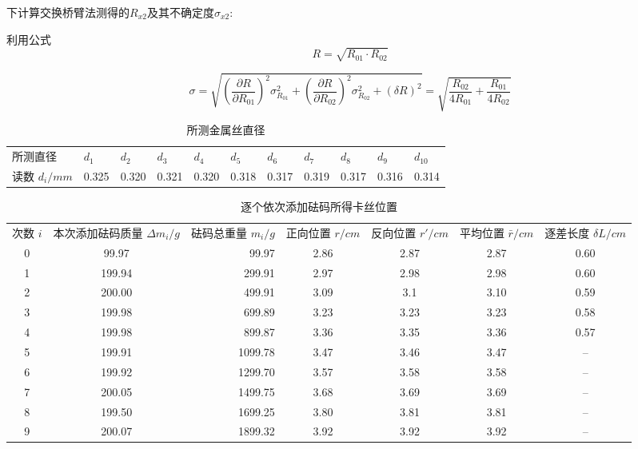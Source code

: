 \documentclass{ctexart}
\begin{document}
 
 下计算交换桥臂法测得的$R_{x2}$及其不确定度$\sigma_{x2}$:
 
 利用公式$$R=\sqrt{R_{01}\cdot R_{02}}$$

$$\sigma=\sqrt{(\frac{\partial R}{\partial R_{01}})^2\sigma_{R_{01}}^2+(\frac{\partial R}{\partial R_{02}})^2\sigma_{R_{02}}^2+(\delta R)^2}=\sqrt{\frac{R_{02}}{4R_{01}}+\frac{R_{01}}{4R_{02}}}$$

\begin{table}[H]
  \centering
  \caption{所测金属丝直径}
   
      \resizebox{\textwidth}{!}
      {
        \begin{tabular}{lrrrrrrrrrr}
    所测直径 & \multicolumn{1}{l}{$d_1$} & \multicolumn{1}{l}{$d_2$} & \multicolumn{1}{l}{$d_3$} & \multicolumn{1}{l}{$d_4$} & \multicolumn{1}{l}{$d_5$} & \multicolumn{1}{l}{$d_6$} & \multicolumn{1}{l}{$d_7$} & \multicolumn{1}{l}{$d_8$} & \multicolumn{1}{l}{$d_9$} & \multicolumn{1}{l}{$d_{10}$} \\
    读数  $d_i/mm$  & 0.325 & 0.320  & 0.321 & 0.320  & 0.318 & 0.317 & 0.319 & 0.317 & 0.316 & 0.314 \\
    \end{tabular}%
      }
  \label{tab:addlabel}%
\end{table}%
\begin{table}[H]
  \centering
  \caption{逐个依次添加砝码所得卡丝位置}
  \resizebox{\textwidth}{!}
  {
    \begin{tabular}{ccrcccc}
    \multicolumn{1}{l}{次数 $i$} & \multicolumn{1}{l}{本次添加砝码质量 $\Delta m_i /g$} & \multicolumn{1}{l}{砝码总重量 $m_i /g$} & \multicolumn{1}{l}{正向位置 $r/cm$} & \multicolumn{1}{l}{反向位置 $r'/cm$} & \multicolumn{1}{l}{平均位置 $\bar{r}/cm$} & \multicolumn{1}{l}{逐差长度 $\delta L/cm$} \\
    0     & 99.97 & 99.97 & 2.86  & 2.87  & 2.87  & 0.60  \\
    1     & 199.94 & 299.91  & 2.97  & 2.98  & 2.98  & 0.60  \\
    2     & 200.00 & 499.91  & 3.09  & 3.1   & 3.10  & 0.59  \\
    3     & 199.98 & 699.89  & 3.23  & 3.23  & 3.23  & 0.58  \\
    4     & 199.98 & 899.87  & 3.36  & 3.35  & 3.36  & 0.57  \\
    5     & 199.91 & 1099.78  & 3.47  & 3.46  & 3.47  & -- \\
    6     & 199.92 & 1299.70  & 3.57  & 3.58  & 3.58  & -- \\
    7     & 200.05 & 1499.75  & 3.68  & 3.69  & 3.69  & -- \\
    8     & 199.50 & 1699.25  & 3.80  & 3.81  & 3.81  & -- \\
    9     & 200.07 & 1899.32  & 3.92  & 3.92  & 3.92  & -- \\
    \end{tabular}%
  }
  \label{tab:addlabel}%
\end{table}%
\end{document}

